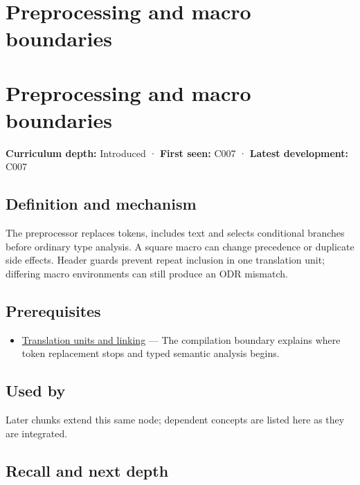 \hypertarget{appendix-33c0a92ce855}{}
\section*{Preprocessing and macro boundaries}
\section{Preprocessing and macro boundaries}\label{appendix-33c0a92ce855-preprocessing-and-macro-boundaries}

\textbf{Curriculum depth:} Introduced · \textbf{First seen:} C007 · \textbf{Latest development:} C007

\subsection{Definition and mechanism}\label{appendix-33c0a92ce855-definition-and-mechanism}

The preprocessor replaces tokens, includes text and selects conditional branches before ordinary type analysis. A square macro can change precedence or duplicate side effects. Header guards prevent repeat inclusion in one translation unit; differing macro environments can still produce an ODR mismatch.

\subsection{Prerequisites}\label{appendix-33c0a92ce855-prerequisites}

\begin{itemize}
\tightlist
\item
  \hyperref[appendix-806686359e1b]{Translation units and linking} --- The compilation boundary explains where token replacement stops and typed semantic analysis begins.
\end{itemize}

\subsection{Used by}\label{appendix-33c0a92ce855-used-by}

Later chunks extend this same node; dependent concepts are listed here as they are integrated.

\subsection{Recall and next depth}\label{appendix-33c0a92ce855-recall-and-next-depth}

